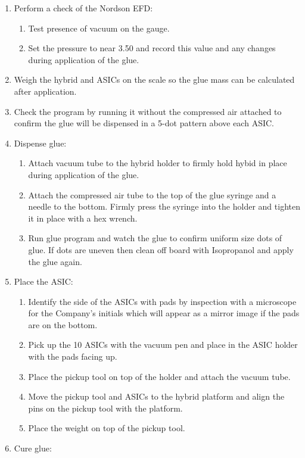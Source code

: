 \documentclass[12pt]{cnihepsop}
\begin{document}
\begin{enumerate}
    \item Perform a check of the Nordson EFD:
    \begin{enumerate}
        \item Test presence of vacuum on the gauge.
        \item Set the pressure to near 3.50 and record this value and any changes during application of the glue.
    \end{enumerate}
      \item Weigh the hybrid and ASICs on the scale so the glue mass can be calculated after application.
	\item Check the program by running it without the compressed air attached to confirm the glue will be dispensed in a 5-dot pattern above each ASIC.
    \item Dispense glue:
    \begin{enumerate}
        \item Attach vacuum tube to the hybrid holder to firmly hold hybid in place during application of the glue.
        \item Attach the compressed air tube to the top of the glue syringe and a needle to the bottom. Firmly press the syringe into the holder and tighten it in place with a hex wrench. 
        \item Run glue program and watch the glue to confirm uniform size dots of glue. If dots are uneven then clean off board with Isopropanol and apply the glue again.
    \end {enumerate}  
    \item Place the ASIC:
    \begin{enumerate}
        \item Identify the side of the ASICs with pads by inspection with a microscope for the Company's initials which will appear as a mirror image if the pads are on the bottom.
        \item Pick up the 10 ASICs with the vacuum pen and place in the ASIC holder with the pads facing up. 
        \item Place the pickup tool on top of the holder and attach the vacuum tube. 
        \item Move the pickup tool and ASICs to the hybrid platform and align the pins on the pickup tool with the platform. 
        \item Place the weight on top of the pickup tool.  
    \end{enumerate}
    \item Cure glue:

\end{enumerate}
\end{document}
